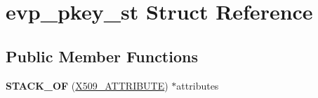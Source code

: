 \hypertarget{structevp__pkey__st}{}\section{evp\+\_\+pkey\+\_\+st Struct Reference}
\label{structevp__pkey__st}
\subsection*{Public Member Functions}
\begin{DoxyCompactItemize}
\item 
\mbox{\label{structevp__pkey__st_a1566b6f371f8086a57f9e2405addb749}} 
{\bfseries S\+T\+A\+C\+K\+\_\+\+OF} (\hyperlink{structx509__attributes__st}{X509\+\_\+\+A\+T\+T\+R\+I\+B\+U\+TE}) $\ast$attributes
\end{DoxyCompactItemize}
